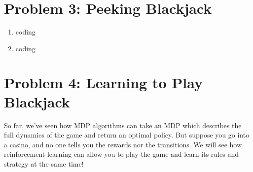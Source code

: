 \documentclass[10pt]{article}
\begin{document}
\section*{\normalsize Problem 3: Peeking Blackjack}

\begin{enumerate}[label=(\alph*)]

  \item coding
  
  \item coding
		
\end{enumerate}

\section*{\normalsize Problem 4: Learning to Play Blackjack}

So far, we've seen how MDP algorithms can take an MDP which describes the full dynamics of the game and return an optimal policy. But suppose you go into a casino, and no one tells you the rewards nor the transitions. We will see how reinforcement learning can allow you to play the game and learn its rules and strategy at the same time!
\end{document}

